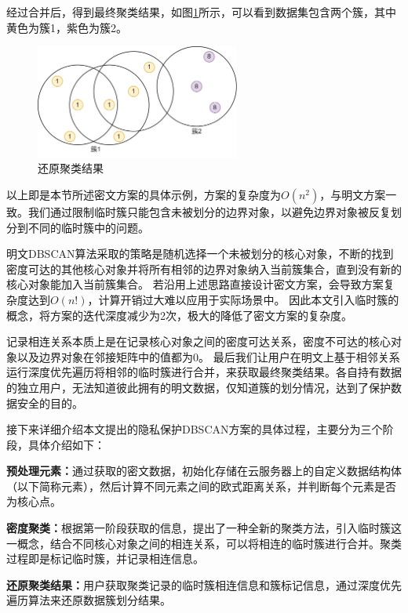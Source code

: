 经过合并后，得到最终聚类结果，如图\ref{dbres}所示，可以看到数据集包含两个簇，其中黄色为簇1，紫色为簇2。
\begin{figure}[htbp]
	\centering
	\includegraphics[width=0.6\textwidth]{img/dbres.png}
	\caption{还原聚类结果}
	\label{dbres}
\end{figure}

以上即是本节所述密文方案的具体示例，方案的复杂度为$ O(n^2) $，与明文方案一致。我们通过限制临时簇只能包含未被划分的边界对象，以避免边界对象被反复划分到不同的临时簇中的问题。

明文DBSCAN算法采取的策略是随机选择一个未被划分的核心对象，不断的找到密度可达的其他核心对象并将所有相邻的边界对象纳入当前簇集合，直到没有新的核心对象能加入当前簇集合。
若沿用上述思路直接设计密文方案，会导致方案复杂度达到$ O(n!) $，计算开销过大难以应用于实际场景中。
因此本文引入临时簇的概念，将方案的迭代深度减少为2次，极大的降低了密文方案的复杂度。

记录相连关系本质上是在记录核心对象之间的密度可达关系，密度不可达的核心对象以及边界对象在邻接矩阵中的值都为0。
最后我们让用户在明文上基于相邻关系运行深度优先遍历将相邻的临时簇进行合并，来获取最终聚类结果。各自持有数据的独立用户，无法知道彼此拥有的明文数据，仅知道簇的划分情况，达到了保护数据安全的目的。

接下来详细介绍本文提出的隐私保护DBSCAN方案的具体过程，主要分为三个阶段，具体介绍如下：
\begin{compactitem}
	\item \textbf{预处理元素：}通过获取的密文数据，初始化存储在云服务器上的自定义数据结构体（以下简称元素），然后计算不同元素之间的欧式距离关系，并判断每个元素是否为核心点。
	\item \textbf{密度聚类：}根据第一阶段获取的信息，提出了一种全新的聚类方法，引入临时簇这一概念，结合不同核心对象之间的相连关系，可以将相连的临时簇进行合并。聚类过程即是标记临时簇，并记录相连信息。
	\item \textbf{还原聚类结果：}用户获取聚类记录的临时簇相连信息和簇标记信息，通过深度优先遍历算法来还原数据簇划分结果。
\end{compactitem}

